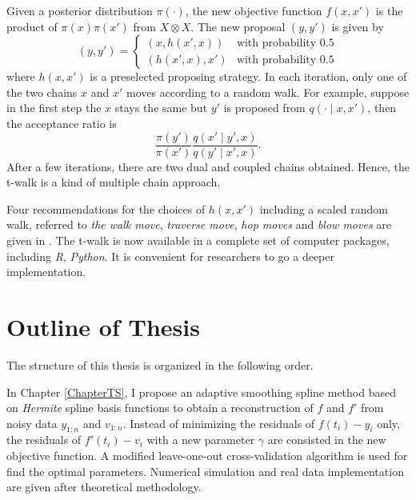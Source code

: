 Given a posterior distribution $\pi(\cdot)$, the new objective function $f(x,x')$ is the product of $\pi(x)\pi(x')$ from $X \otimes X$. The new proposal $(y,y')$ is given by
\begin{equation*} (y,y') =
\begin{cases}
\left(x,h(x',x)\right) & \mbox{with probability 0.5}\\
\left(h(x',x),x'\right) & \mbox{with probability 0.5}
\end{cases}
\end{equation*}
where $h(x,x')$ is a preselected proposing strategy. In each iteration, only one of the two chains $x$ and $x'$ moves according to a random walk. For example, suppose in the first step the $x$ stays the same but $y'$ is proposed from $q(\cdot\mid x,x')$, then the acceptance ratio is 
\begin{equation*}
\frac{\pi\left(y'\right)}{\pi\left(x'\right)}\frac{q\left(x'\mid y',x\right) }{q\left(y'\mid x',x\right)}. 
\end{equation*}
After a few iterations, there are two dual and coupled chains obtained. Hence, the t-walk is a kind of multiple chain approach. 

Four recommendations for the choices of $h\left(x,x'\right)$ including a scaled random walk, referred to \textit{the walk move}, \textit{traverse move}, \textit{hop moves} and \textit{blow moves} are given in \cite{christen2010general}. The t-walk is now available in a complete set of computer packages, including \textit{R}, \textit{Python}. It is convenient for researchers to go a deeper implementation. 



\section{Outline of Thesis}

The structure of this thesis is organized in the following order. 

In Chapter \ref{ChapterTS}, I propose an adaptive smoothing spline method based on \textit{Hermite} spline basis functions to obtain a reconstruction of $f$ and $f'$ from noisy data $y_{1:n}$ and $v_{1:n}$. Instead of minimizing the residuals of $f(t_i)-y_i$ only, the residuals of $f'(t_i)-v_i$ with a new parameter $\gamma$ are consisted in the new objective function. A modified leave-one-out cross-validation algorithm is used for find the optimal parameters. Numerical simulation and real data implementation are given after theoretical methodology. 

